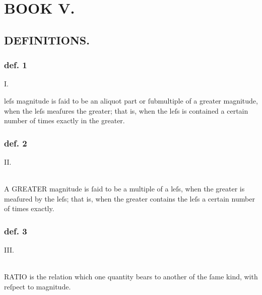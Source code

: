 \pagestyle{fancy}
\fancyhf{}
\renewcommand{\headrulewidth}{0pt}
%

\section[Book V]{\centering BOOK V.}
\label{sec:book5}

\hfill

\subsection[Definitions]{\centering \scshape{\LARGE{DEFINITIONS.}}}
\label{subsec:definitions}

\hfill

\begin{center}
    \begin{minipage}{0.8\textwidth}
        \subsubsection{def. 1}
        \begin{center}
            I.\label{book5def1}\\
            \raggedright \lettrine[lines=3, loversize=1, nindent=0pt]{}{} leſs magnitude is ſaid to be an aliquot part or ſubmultiple of a greater magnitude, when the leſs meaſures the greater; that is, when the leſs is contained a certain number of times exactly in the greater.
        \end{center}
        \subsubsection{def. 2}
        \begin{center}
            II.\label{book5def2}\\
            \hfill\\
            \raggedright A \textsc{GREATER} magnitude is ſaid to be a multiple of a leſs, when the greater is meaſured by the leſs; that is, when the greater contains the leſs a certain number of times exactly.
        \end{center}
        \subsubsection{def. 3}
        \begin{center}
            III.\label{book5def3}\\
            \hfill\\
            \raggedright R\textsc{ATIO} is the relation which one quantity bears to another of the ſame kind, with reſpect to magnitude.
        \end{center}

\end{minipage}
\end{center}

